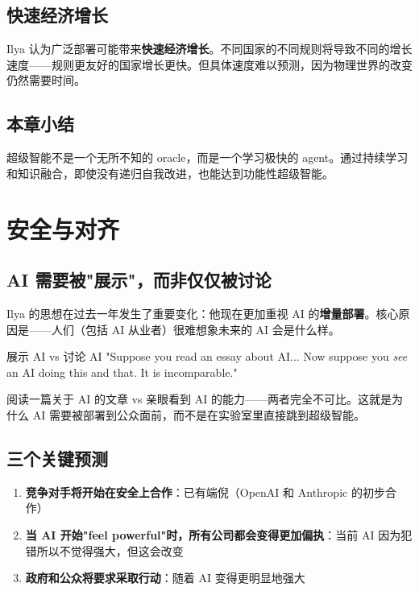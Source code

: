 \documentclass[a4paper]{article}
\begin{document}
\subsection{快速经济增长}

Ilya 认为广泛部署可能带来\textbf{快速经济增长}。不同国家的不同规则将导致不同的增长速度——规则更友好的国家增长更快。但具体速度难以预测，因为物理世界的改变仍然需要时间。

\subsection{本章小结}

超级智能不是一个无所不知的 oracle，而是一个学习极快的 agent。通过持续学习和知识融合，即使没有递归自我改进，也能达到功能性超级智能。


\section{安全与对齐}

\subsection{AI 需要被"展示"，而非仅仅被讨论}

Ilya 的思想在过去一年发生了重要变化：他现在更加重视 AI 的\textbf{增量部署}。核心原因是——人们（包括 AI 从业者）很难想象未来的 AI 会是什么样。

\begin{importantbox}{展示 AI vs 讨论 AI}
"Suppose you read an essay about AI... Now suppose you \textit{see} an AI doing this and that. It is incomparable."

阅读一篇关于 AI 的文章 vs 亲眼看到 AI 的能力——两者完全不可比。这就是为什么 AI 需要被部署到公众面前，而不是在实验室里直接跳到超级智能。
\end{importantbox}

\subsection{三个关键预测}

\begin{enumerate}
    \item \textbf{竞争对手将开始在安全上合作}：已有端倪（OpenAI 和 Anthropic 的初步合作）
    \item \textbf{当 AI 开始"feel powerful"时，所有公司都会变得更加偏执}：当前 AI 因为犯错所以不觉得强大，但这会改变
    \item \textbf{政府和公众将要求采取行动}：随着 AI 变得更明显地强大
\end{enumerate}
\end{document}
